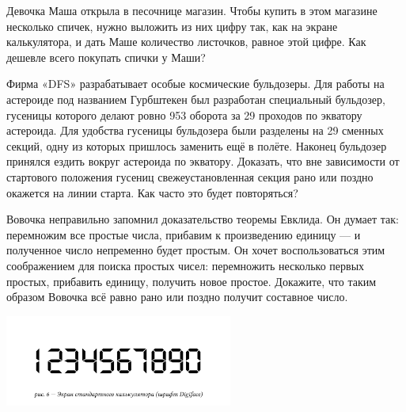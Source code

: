 \begin{itemize}
\itA Девочка Маша открыла в песочнице магазин. Чтобы купить в этом магазине несколько спичек, нужно выложить из них цифру так, как на экране калькулятора, и дать Маше количество листочков, равное этой цифре. Как дешевле всего покупать спички у Маши?

\itB Фирма «DFS» разрабатывает особые космические бульдозеры. Для работы на астероиде под названием Гурбштекен был разработан специальный бульдозер, гусеницы которого делают ровно 953 оборота за 29 проходов по экватору астероида. Для удобства гусеницы бульдозера были разделены на 29 сменных секций, одну из которых пришлось заменить ещё в полёте. Наконец бульдозер принялся ездить вокруг астероида по экватору. Доказать, что вне зависимости от стартового положения гусениц свежеустановленная секция рано или поздно окажется на линии старта. Как часто это будет повторяться?

\itC Вовочка неправильно запомнил доказательство теоремы Евклида. Он думает так: перемножим все простые числа, прибавим к произведению единицу --- и полученное число непременно будет простым. Он хочет воспользоваться этим соображением для поиска простых чисел: перемножить несколько первых простых, прибавить единицу, получить новое простое. Докажите, что таким образом Вовочка всё равно рано или поздно получит составное число.
\end{itemize}

\begin{center}
  \includegraphics[width=7.5cm]{stats/2016/Figures/Digiface.png}
\end{center}
